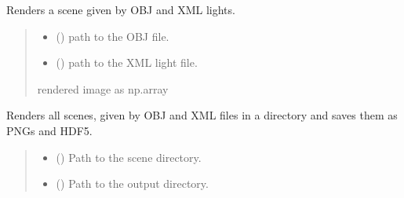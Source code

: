 \documentclass[letterpaper,10pt,english]{sphinxmanual}
\begin{document}
\begin{fulllineitems}
\label{\detokenize{mitsuba_render_h5:mitsuba_render_h5.render_scene}}
\pysigstartsignatures
\pysiglinewithargsret
{}
{\sphinxparamcomma {}}
{}
\pysigstopsignatures
\sphinxAtStartPar
Renders a scene given by OBJ and XML lights.
\begin{quote}\begin{description}
\begin{itemize}
\item {} 
\sphinxAtStartPar
{} () \textendash{} path to the OBJ file.

\item {} 
\sphinxAtStartPar
{} () \textendash{} path to the XML light file.

\end{itemize}

\sphinxAtStartPar
rendered image as np.array

\end{description}\end{quote}

\end{fulllineitems}


\begin{fulllineitems}
\label{\detokenize{mitsuba_render_h5:mitsuba_render_h5.render_scenes_h5}}
\pysigstartsignatures
\pysiglinewithargsret
{}
{\sphinxparamcomma {}}
{}
\pysigstopsignatures
\sphinxAtStartPar
Renders all scenes, given by OBJ and XML files in a directory and saves them as PNGs and HDF5.
\begin{quote}\begin{description}
\begin{itemize}
\item {} 
\sphinxAtStartPar
{} () \textendash{} Path to the scene directory.

\item {} 
\sphinxAtStartPar
{} () \textendash{} Path to the output directory.

\end{itemize}

\end{description}\end{quote}

\end{fulllineitems}
\end{document}
